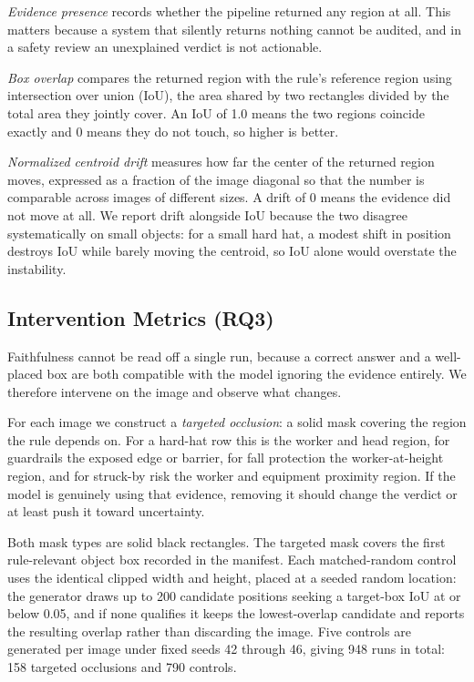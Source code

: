 \documentclass[conference]{IEEEtran}
\begin{document}
\textit{Evidence presence} records whether the pipeline returned any region at all. This matters because a system that silently returns nothing cannot be audited, and in a safety review an unexplained verdict is not actionable.

\textit{Box overlap} compares the returned region with the rule's reference region using intersection over union (IoU), the area shared by two rectangles divided by the total area they jointly cover. An IoU of 1.0 means the two regions coincide exactly and 0 means they do not touch, so higher is better.

\textit{Normalized centroid drift} measures how far the center of the returned region moves, expressed as a fraction of the image diagonal so that the number is comparable across images of different sizes. A drift of 0 means the evidence did not move at all. We report drift alongside IoU because the two disagree systematically on small objects: for a small hard hat, a modest shift in position destroys IoU while barely moving the centroid, so IoU alone would overstate the instability.

\subsection{Intervention Metrics (RQ3)}

Faithfulness cannot be read off a single run, because a correct answer and a well-placed box are both compatible with the model ignoring the evidence entirely. We therefore intervene on the image and observe what changes.

For each image we construct a \textit{targeted occlusion}: a solid mask covering the region the rule depends on. For a hard-hat row this is the worker and head region, for guardrails the exposed edge or barrier, for fall protection the worker-at-height region, and for struck-by risk the worker and equipment proximity region. If the model is genuinely using that evidence, removing it should change the verdict or at least push it toward uncertainty.

Both mask types are solid black rectangles. The targeted mask covers the first rule-relevant object box recorded in the manifest. Each matched-random control uses the identical clipped width and height, placed at a seeded random location: the generator draws up to 200 candidate positions seeking a target-box IoU at or below 0.05, and if none qualifies it keeps the lowest-overlap candidate and reports the resulting overlap rather than discarding the image. Five controls are generated per image under fixed seeds 42 through 46, giving 948 runs in total: 158 targeted occlusions and 790 controls.
\end{document}

